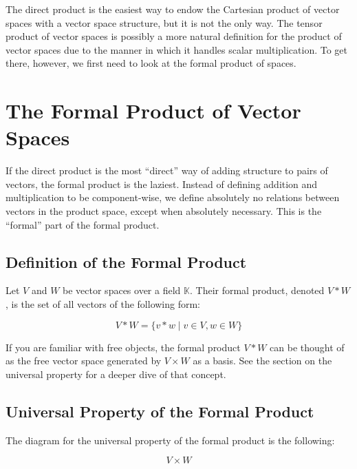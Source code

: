 \documentclass[12pt, titlepage]{article}
\begin{document}
The direct product is the easiest way to endow the Cartesian product of vector
spaces with a vector space structure, but it is not the only way. The tensor
product of vector spaces is possibly a more natural definition for the product
of vector spaces due to the manner in which it handles scalar multiplication.
To get there, however, we first need to look at the formal product of spaces.

\section{The Formal Product of Vector Spaces}

If the direct product is the most ``direct'' way of adding structure to pairs
of vectors, the formal product is the laziest. Instead of defining addition and
multiplication to be component-wise, we define absolutely no relations between
vectors in the product space, except when absolutely necessary. This is the
``formal'' part of the formal product.

\subsection{Definition of the Formal Product}

Let $V$ and $W$ be vector spaces over a field $\mathbb{K}$. Their formal
product, denoted $V * W$, is the set of all vectors of the following form:

\begin{displaymath}
  V * W = \{v * w \mid v \in V, w \in W\}
\end{displaymath}

If you are familiar with free objects, the formal product $V * W$ can be
thought of as the free vector space generated by $V \times W$ as a basis. See
the section on the universal property for a deeper dive of that concept.

\subsection{Universal Property of the Formal Product}

The diagram for the universal property of the formal product is the following:

\begin{displaymath}
  V \times W
\end{displaymath}
\end{document}

